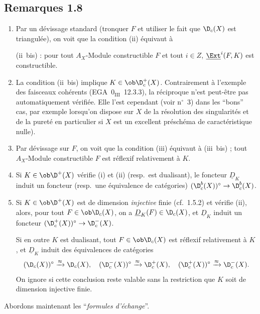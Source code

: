 \subsection*{Remarques 1.8}
\begin{enumerate}[label=\alph*)]
\item Par un dévissage standard (tronquer $F$ et utiliser le fait que $\D_c(X)$ est triangulée), on voit que la condition (ii) équivaut à

(ii~bis) : pour tout $A_X$-Module constructible $F$ et tout $i \in Z$, $\underline{\Ext}^i(F,K)$ est constructible.

\item La condition (ii~bis) implique $K \in \ob \D_c^{+}(X)$. Contrairement à l'exemple des faisceaux cohérents (EGA~$0_{\mathrm{III}}$~12.3.3), la réciproque n'est peut-être pas automatiquement vérifiée. Elle l'est cependant (voir n${}^{\circ}$~3) dans les ``bons'' cas, par exemple lorsqu'on dispose sur $X$ de la résolution des singularités et de la
pureté en particulier si $X$ est un excellent préschéma de caractéristique nulle).

\item Par dévissage sur $F$, on voit que la condition (iii) équivaut à (iii~bis) ; tout $A_X$-Module constructible $F$ est réflexif relativement à $K$.

\item Si $K \in \ob \D^{+}(X)$ vérifie (i) et (ii) (resp.~est dualisant), le foncteur $\underline{D}_K$ induit un foncteur (resp.~une équivalence de catégories) $(\D_c^{b}(X))^{\circ} \to \D_c^{b}(X)$.

\item Si $K \in \ob \D^{+}(X)$ est de dimension \emph{injective} finie (cf.~1.5.2) et vérifie (ii), alors, pour tout $F \in \ob \D_c(X)$, on a $\underline{D}_K(F) \in \D_c(X)$, et $\underline{D}_K$ induit un foncteur $(\D_c^{+}(X))^{\circ} \to \D_c^{-}(X)$.

Si en outre $K$ est dualisant, tout $F \in \ob \D_c(X)$ est réflexif relativement à $K$, et $\underline{D}_K$ induit des équivalences de catégories
\[
(\D_c(X))^{\circ} \xrightarrow{\approx} \D_c(X), \quad (\D_c^{-}(X))^{\circ} \xrightarrow{\approx} \D_c^{+}(X), \quad (\D_c^{+}(X))^{\circ} \xrightarrow{\approx} \D_c^{-}(X).
\]
On ignore si cette conclusion reste valable sans la restriction que $K$ soit de dimension injective finie.
\end{enumerate}

Abordons maintenant les ``\emph{formules d'échange}''.

